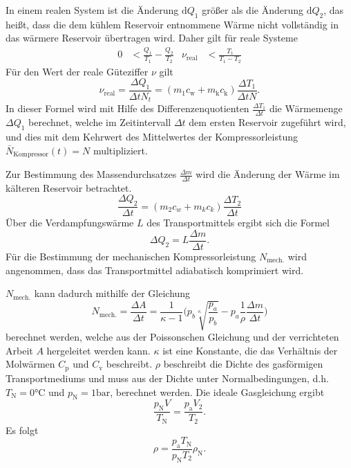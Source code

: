 In einem realen System ist die Änderung $\mathup{d}Q_1$ größer als die Änderung $\mathup{d}Q_2$, das heißt, dass die dem kühlem Reservoir entnommene Wärme nicht vollständig in das wärmere Reservoir übertragen wird.
Daher gilt für reale Systeme
\begin{align}
	 0 &< \frac{Q_1}{T_1}-\frac{Q_2}{T_2} & \nu_{\text{real}} &< \frac{T_1}{T_1-T_2}
\end{align}
Für den Wert der reale Güteziffer $\nu$ gilt
\begin{equation}
	\nu_\mathup{real}=\frac{\Delta{Q_1}}{{\Delta{t}}N_t}=(m_1c_\mathup{w}+m_\mathup{k}c_\mathup{k})\frac{\Delta{T_1}}{{\Delta{t}}N}.
	\label{waermemenge/zeitintervall}
\end{equation}
In dieser Formel wird mit Hilfe des Differenzenquotienten $\frac{\Delta{T_1}}{\Delta{t}}$ die Wärmemenge $\Delta{Q_1}$ berechnet, 
welche im Zeitintervall $\Delta{t}$ dem ersten Reservoir zugeführt wird, 
und dies mit dem Kehrwert des Mittelwertes der Kompressorleistung $\bar{N}_\text{Kompressor}(t) = N$ multipliziert.

Zur Bestimmung des Massendurchsatzes $\frac{\Delta{m}}{\Delta{t}}$ wird die Änderung der Wärme im kälteren Reservoir betrachtet.
\begin{equation}
	\frac{\Delta Q_2}{\Delta t} =(m_2 c_w + m_k c_k)\frac{\Delta T_2}{\Delta t}
\end{equation}
Über die Verdampfungswärme $L$ des Transportmittels ergibt sich die Formel
\begin{equation}
	\Delta Q_2 =L\frac{\Delta m} {\Delta t}.	
\end{equation}
Für die Bestimmung der mechanischen Kompressorleistung $N_\text{mech.}$ wird angenommen, dass das Transportmittel adiabatisch komprimiert wird. 

$N_\text{mech.}$ kann dadurch mithilfe der Gleichung
\begin{equation}
	N_\mathup{mech.}=\frac{\Delta{A}}{\Delta{t}}=\frac{1}{\kappa-1}\biggl(p_b \sqrt[\kappa]{\frac{p_a}{p_b}}-p_a\frac{1}{\rho}\frac{\Delta{m}}{\Delta{t}}\biggr)
\end{equation}
berechnet werden, welche aus der Poissonschen Gleichung und der verrichteten Arbeit $A$ hergeleitet werden kann. 
$\kappa$ ist eine Konstante, die das Verhältnis der Molwärmen $C_\mathup{p}$ und $C_\mathup{v}$ beschreibt. 
$\rho$ beschreibt die Dichte des gasförmigen Transportmediums und muss aus der Dichte unter Normalbedingungen, d.h. $T_\mathup{N}=0\si{\celsius}$ und $p_\mathup{N}=1\si{\bar}$, berechnet werden. 
Die ideale Gasgleichung ergibt
\begin{equation}
	\frac{p_\mathup{N} V}{T_\mathup{N}}=\frac{p_\mathup{a} V_2}{T_2}.
\end{equation}
Es folgt
\begin{equation}
	\rho=\frac{p_\mathup{a}T_\mathup{N}}{p_\mathup{N}T_2}\rho_\mathup{N}.
\end{equation}
